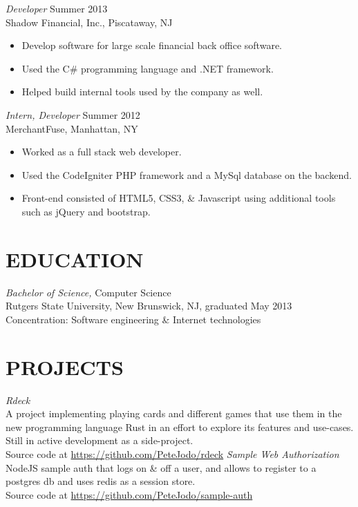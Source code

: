 \documentclass[margin]{res}
\begin{document}
\begin{resume}
                {\sl Developer} \hfill            Summer 2013 \\
                Shadow Financial, Inc., Piscataway, NJ
                 \begin{itemize}  \itemsep -2pt %
                 \item Develop software for large scale financial back office software.
                 \item Used the C\# programming language and .NET framework.
                 \item Helped build internal tools used by the company as well.
                 \end{itemize}
                 
               {\sl Intern, Developer} \hfill            Summer 2012 \\
                MerchantFuse, Manhattan, NY
                 \begin{itemize}  \itemsep -2pt %
                 \item Worked as a full stack web developer.
                 \item Used the CodeIgniter PHP framework and a MySql database on the backend.
                 \item Front-end consisted of HTML5, CSS3, \& Javascript using additional tools such as jQuery and bootstrap.
                 \end{itemize} 
 
\section{EDUCATION} {\sl Bachelor of Science,} Computer Science \\
                Rutgers State University, New Brunswick, NJ, 
                graduated May 2013 \\
                Concentration: Software engineering \& Internet technologies \\
 
\section{PROJECTS}  {\sl Rdeck} \\
					A project implementing playing cards and different games that use them in the new programming language Rust in an effort to explore its features and use-cases. Still in active development as a side-project.  \\
					Source code at \url{https://github.com/PeteJodo/rdeck} \newline \newline
					{\sl Sample Web Authorization} \\
					NodeJS sample auth that logs on \& off a user, and allows to register to a postgres db and uses redis as a session store. \\
					Source code at \url{https://github.com/PeteJodo/sample-auth}
                 
 

\end{resume}
\end{document}
